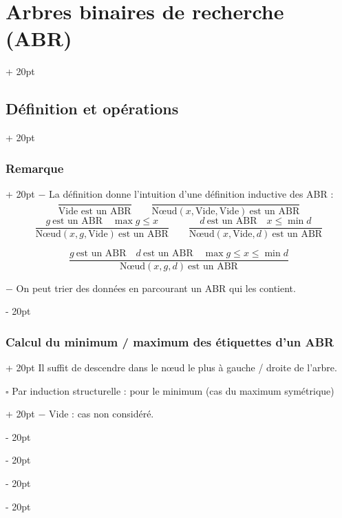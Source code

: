 \documentclass[a4paper, 12pt, twoside]{article}
\renewcommand{\le}{\leqslant}
\newcommand{\ind}[1][20pt]{\advance\leftskip + #1}
\newcommand{\deind}[1][20pt]{\advance\leftskip - #1}
\newenvironment{indt}[2][20pt]{#2 \par \ind[#1]}{\par \deind} %
\begin{document}
\begin{indt}{\section{Arbres binaires de recherche (ABR)}}
\begin{indt}{\subsection{Définition et opérations}}
            \vspace{12pt}
            
            \begin{indt}{\subsubsection{Remarque}}
                $-$ La définition donne l'intuition d'une définition inductive des ABR :
                    \[
                        \dfrac{}{\text{Vide est un ABR}}
                        \qquad
                        \dfrac{}{\text{N\oe ud}(x, \text{Vide}, \text{Vide})\ \text{est un ABR}}
                    \]
                    \[
                        \dfrac{g\ \text{est un ABR} \quad \max g \le x}{\text{N\oe ud}(x, g, \text{Vide})\ \text{est un ABR}}
                        \qquad
                        \dfrac{d\ \text{est un ABR} \quad x \le \min d}{\text{N\oe ud}(x, \text{Vide}, d)\ \text{est un ABR}}
                    \]
                    
                    \[
                        \dfrac{g\ \text{est un ABR} \quad d \ \text{est un ABR} \quad \max g \le x \le \min d}{\text{N\oe ud}(x, g, d)\ \text{est un ABR}}
                    \]
                
                \vspace{12pt}
                
                $-$ On peut trier des données en parcourant un ABR qui les contient.
            \end{indt}
            
            \vspace{12pt}
            
            \begin{indt}{\subsubsection{Calcul du minimum / maximum des étiquettes d'un ABR}}
                Il suffit de descendre dans le n\oe ud le plus à gauche / droite de l'arbre.
                
                \vspace{12pt}
                
                \begin{indt}{$\square$ Par induction structurelle : pour le minimum (cas du maximum symétrique)}
                    $-$ Vide : cas non considéré.
                    

\end{indt}
\end{indt}
\end{indt}
\end{indt}
\end{document}
